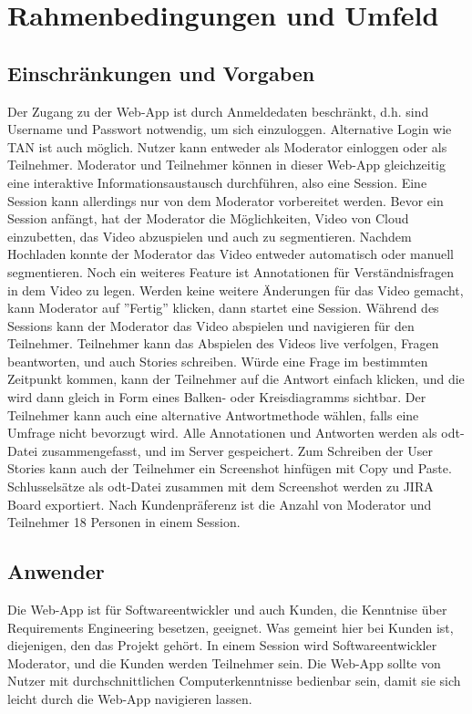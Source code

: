\section{Rahmenbedingungen und Umfeld}

\subsection{Einschränkungen und Vorgaben}
Der Zugang zu der Web-App ist durch Anmeldedaten beschränkt, d.h. sind Username und Passwort notwendig, um sich einzuloggen. Alternative Login wie TAN ist auch möglich. Nutzer kann entweder als Moderator einloggen oder als Teilnehmer. Moderator und Teilnehmer können in dieser Web-App gleichzeitig eine interaktive Informationsaustausch durchführen, also eine Session. Eine Session kann allerdings nur von dem Moderator vorbereitet werden.\linebreak
\linebreak
Bevor ein Session anfängt, hat der Moderator die Möglichkeiten, Video von Cloud einzubetten, das Video abzuspielen und auch zu segmentieren. Nachdem Hochladen konnte der Moderator das Video entweder automatisch oder manuell segmentieren. Noch ein weiteres Feature ist Annotationen für Verständnisfragen in dem Video zu legen. Werden keine weitere Änderungen für das Video gemacht, kann Moderator auf ''Fertig'' klicken, dann startet eine Session.\linebreak
\linebreak
Während des Sessions kann der Moderator das Video abspielen und navigieren für den Teilnehmer. Teilnehmer kann das Abspielen des Videos live verfolgen, Fragen beantworten, und auch Stories schreiben. Würde eine Frage im bestimmten Zeitpunkt kommen, kann der Teilnehmer auf die Antwort einfach klicken, und die wird dann gleich in Form eines Balken- oder Kreisdiagramms sichtbar. Der Teilnehmer kann auch eine alternative Antwortmethode wählen, falls eine Umfrage nicht bevorzugt wird. Alle Annotationen und Antworten werden als odt-Datei zusammengefasst, und im Server gespeichert. Zum Schreiben der User Stories kann auch der Teilnehmer ein Screenshot hinfügen mit Copy und Paste. Schlusselsätze als odt-Datei zusammen mit dem Screenshot werden zu JIRA Board exportiert.\linebreak
\linebreak
Nach Kundenpräferenz ist die Anzahl von Moderator und Teilnehmer 18 Personen in einem Session.

\subsection{Anwender}
Die Web-App ist für Softwareentwickler und auch Kunden, die Kenntnise über Requirements Engineering besetzen, geeignet. Was gemeint hier bei Kunden ist, diejenigen, den das Projekt gehört. In einem Session wird Softwareentwickler Moderator, und die Kunden werden Teilnehmer sein. Die Web-App sollte von Nutzer mit durchschnittlichen Computerkenntnisse bedienbar sein, damit sie sich leicht durch die Web-App navigieren lassen.

